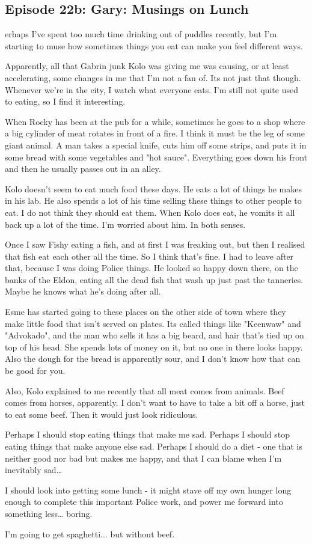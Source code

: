 \subsection{Episode 22b: Gary: Musings on Lunch}

erhaps I’ve spent too much time drinking out of puddles recently, but I’m starting to muse how sometimes things you eat can make you feel different ways.\medskip

Apparently, all that Gabrin junk Kolo was giving me was causing, or at least accelerating, some changes in me that I'm not a fan of. Its not just that though. Whenever we're in the city, I watch what everyone eats. I'm still not quite used to eating, so I find it interesting.\medskip

When Rocky has been at the pub for a while, sometimes he goes to a shop where a big cylinder of meat rotates in front of a fire. I think it must be the leg of some giant animal. A man takes a special knife, cuts him off some strips, and puts it in some bread with some vegetables and "hot sauce". Everything goes down his front and then he usually passes out in an alley.\medskip

Kolo doesn't seem to eat much food these days. He eats a lot of things he makes in his lab. He also spends a lot of his time selling these things to other people to eat. I do not think they should eat them. When Kolo does eat, he vomits it all back up a lot of the time. I'm worried about him. In both senses.\medskip

Once I saw Fishy eating a fish, and at first I was freaking out, but then I realised that fish eat each other all the time. So I think that's fine. I had to leave after that, because I was doing Police things. He looked so happy down there, on the banks of the Eldon, eating all the dead fish that wash up just past the tanneries. Maybe he knows what he's doing after all.\medskip

Esme has started going to these places on the other side of town where they make little food that isn't served on plates. Its called things like "Keenwaw" and "Advokado", and the man who sells it has a big beard, and hair that's tied up on top of his head. She spends lots of money on it, but no one in there looks happy. Also the dough for the bread is apparently sour, and I don't know how that can be good for you.\medskip

Also, Kolo explained to me recently that all meat comes from animals. Beef comes from horses, apparently. I don't want to have to take a bit off a horse, just to eat some beef. Then it would just look ridiculous.\medskip

Perhaps I should stop eating things that make me sad. Perhaps I should stop eating things that make anyone else sad. Perhaps I should do a diet - one that is neither good nor bad but makes me happy, and that I can blame when I'm inevitably sad…\medskip

I should look into getting some lunch - it might stave off my own hunger long enough to complete this important Police work, and power me forward into something less… boring.\medskip

I'm going to get spaghetti... but without beef.\medskip

\vspace*{5mm}
